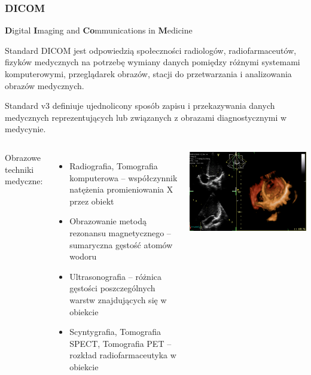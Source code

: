 \documentclass[aspectratio=169]{beamer}
\begin{document}
\begin{frame}[t]
    \frametitle{DICOM}
    \normalsize
    \textbf{D}igital \textbf{I}maging and \textbf{Co}mmunications in \textbf{M}edicine

    \vspace{1em}
    \scriptsize
    Standard DICOM jest odpowiedzią społeczności radiologów, radiofarmaceutów, fizyków medycznych na potrzebę wymiany danych pomiędzy różnymi systemami komputerowymi, przeglądarek obrazów, stacji do przetwarzania i analizowania obrazów medycznych.

    \vspace{1em}
    Standard \DICOM v3 definiuje ujednolicony sposób zapisu i przekazywania danych medycznych reprezentujących lub związanych z obrazami diagnostycznymi w medycynie.


    \begin{columns}[T]
        \vspace{1em}
        \normalsize
        \hspace*{0.3em}Obrazowe techniki medyczne:
        \scriptsize
        \begin{itemize}
            \item Radiografia, Tomografia komputerowa -- współczynnik natężenia promieniowania X przez obiekt
            \item Obrazowanie metodą rezonansu magnetycznego -- sumaryczna gęstość atomów wodoru
            \item Ultrasonografia -- różnica gęstości poszczególnych warstw znajdujących się w obiekcie
            \item Scyntygrafia, Tomografia SPECT, Tomografia PET -- rozkład radiofarmaceutyka w obiekcie
        \end{itemize}

        \includegraphics[height=0.4\textheight]{img/usg.png}


    \end{columns}
\end{frame}
\end{document}
